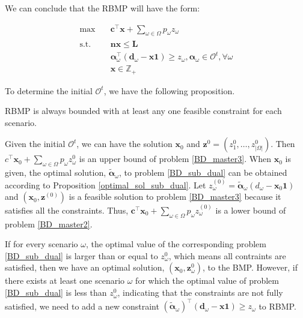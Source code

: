 We can conclude that the RBMP will have the form:

\begin{equation}\label{BD_master3}
  \begin{aligned}
    \max \quad & \mathbf{c}^{\intercal} \mathbf{x} + \sum_{\omega \in \Omega} p_{\omega} z_{\omega} \\
    \text {s.t.} \quad & \mathbf{n} \mathbf{x} \leq \mathbf{L} \\
    & \bm{\alpha}_{\omega}^{\intercal}(\mathbf{d}_{\omega}- \mathbf{x} \mathbf{1}) \geq z_{\omega}, \bm{\alpha}_{\omega} \in \mathcal{O}^{t}, \forall \omega \\
     & \mathbf{x} \in \mathbb{Z}_{+}
  \end{aligned}
\end{equation}

To determine the initial $\mathcal{O}^{t}$, we have the following proposition.

\begin{prop}\label{one_ep_feasible}
RBMP is always bounded with at least any one feasible constraint for each scenario.
\end{prop}

Given the initial $\mathcal{O}^{t}$, we can have the solution $\mathbf{x}_{0}$ and $\mathbf{z}^{0} =(z^{0}_1,\ldots, z^{0}_{|\Omega|})$. Then $c^{\intercal} \mathbf{x}_0 + \sum_{\omega \in \Omega} p_{\omega} z_{\omega}^{0}$ is an upper bound of problem \eqref{BD_master3}. When $\mathbf{x}_0$ is given, the optimal solution, $\bm{\tilde{\alpha}}_{\omega}$, to problem \eqref{BD_sub_dual} can be obtained according to Proposition \ref{optimal_sol_sub_dual}. Let $z_{\omega}^{(0)} = \bm{\tilde{\alpha}}_{\omega}(d_{\omega} - \mathbf{x}_0 \mathbf{1})$ and $(\mathbf{x}_0, \mathbf{z}^{(0)})$ is a feasible solution to problem \eqref{BD_master3} because it satisfies all the constraints. Thus, $\mathbf{c}^{\intercal} \mathbf{x}_0 + \sum_{\omega \in \Omega} p_{\omega} z_{\omega}^{(0)}$ is a lower bound of problem \eqref{BD_master2}.

If for every scenario $\omega$, the optimal value of the corresponding problem \eqref{BD_sub_dual} is larger than or equal to $z_{\omega}^{0}$, which means all contraints are satisfied, then we have an optimal solution, $(\mathbf{x}_{0}, \mathbf{z}_{\omega}^{0})$, to the BMP. However, if there exists at least one scenario $\omega$ for which the optimal value of problem \eqref{BD_sub_dual} is less than $z_{\omega}^{0}$, indicating that the constraints are not fully satisfied, we need to add a new constraint $(\bm{\tilde{\alpha}}_{\omega})^{\intercal}(\mathbf{d}_{\omega} - \mathbf{x} \mathbf{1}) \geq z_{\omega}$ to RBMP.


